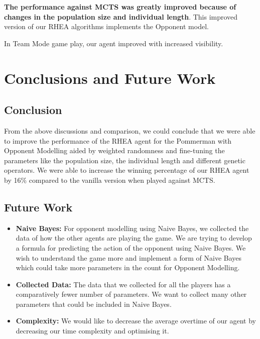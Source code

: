 \documentclass{report}
\begin{document}
\textbf{The performance against MCTS  was greatly improved because of changes in the population size and individual length}. This improved version of our RHEA algorithms implements the Opponent model.

In Team Mode game play, our agent improved with increased visibility. 

\chapter{Conclusions and Future Work} 

\section{Conclusion}
From the above discussions and comparison, we could conclude that we were able to improve the performance of the RHEA agent for the Pommerman with Opponent Modelling aided by weighted randomness and fine-tuning the parameters like the population size, the individual length and different genetic operators. 
We were able to increase the winning percentage of our RHEA agent by 16\% compared to the vanilla version when played against MCTS.
\section{Future Work}
\begin{itemize}
	\item \textbf{Naive Bayes:} For opponent modelling using Naive Bayes, we collected the data of how the other agents are playing the game. We are trying to develop a formula for predicting the action of the opponent using Naive Bayes. We wish to understand the game more and implement a form of Naive Bayes which could take more parameters in the count for Opponent Modelling.
	\item \textbf{Collected Data:} The data that we collected for all the players has a comparatively fewer number of parameters. We want to collect many other parameters that could be included in Naive Bayes.
	\item \textbf{Complexity: }We would like to decrease the average overtime of our agent by decreasing our time complexity and optimising it.
\end{itemize}
	
	
\end{document}
